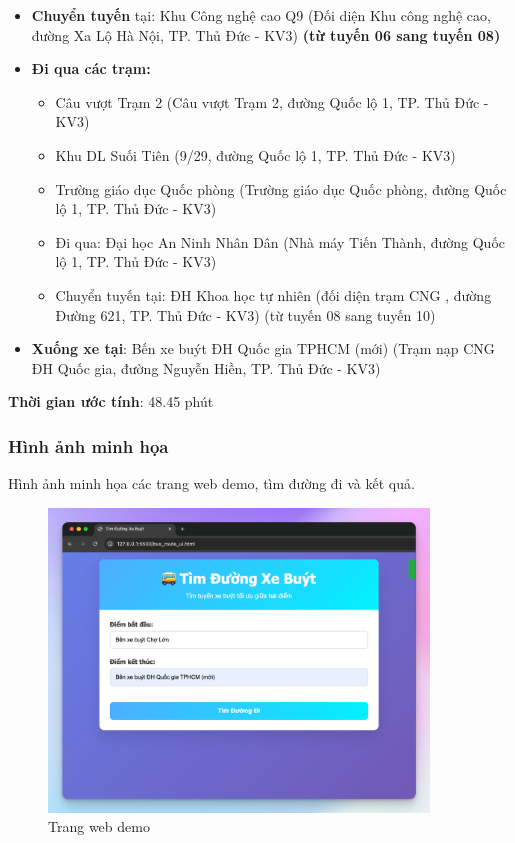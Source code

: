 \documentclass[a4paper,12pt]{article}
\begin{document}
\begin{itemize}
    \item \textbf{Chuyển tuyến} tại: Khu Công nghệ cao Q9 (Đối diện Khu công nghệ cao, đường Xa Lộ Hà Nội, TP. Thủ Đức - KV3) \textbf{(từ tuyến 06 sang tuyến 08)}
    
    \item \textbf{Đi qua các trạm:}
    \begin{itemize}
        \item Câu vượt Trạm 2 (Câu vượt Trạm 2, đường Quốc lộ 1, TP. Thủ Đức - KV3)
        \item Khu DL Suối Tiên (9/29, đường Quốc lộ 1, TP. Thủ Đức - KV3)
        \item Trường giáo dục Quốc phòng (Trường giáo dục Quốc phòng, đường Quốc lộ 1, TP. Thủ Đức - KV3)
        \item Đi qua: Đại học An Ninh Nhân Dân (Nhà máy Tiến Thành, đường Quốc lộ 1, TP. Thủ Đức - KV3)
        \item Chuyển tuyến tại: ĐH Khoa học tự nhiên (đối diện trạm CNG , đường Đường 621, TP. Thủ Đức - KV3) (từ tuyến 08 sang tuyến 10)
    \end{itemize}
    \item \textbf{Xuống xe tại}: Bến xe buýt ĐH Quốc gia TPHCM (mới) (Trạm nạp CNG ĐH Quốc gia, đường Nguyễn Hiền, TP. Thủ Đức - KV3)
\end{itemize}

\textbf{Thời gian ước tính}: 48.45 phút

\subsubsection{Hình ảnh minh họa}
Hình ảnh minh họa các trang web demo, tìm đường đi và kết quả.

\begin{figure}[H]
    \centering
    \includegraphics[width=0.9\textwidth]{images/image1.png}
    \caption{Trang web demo}
    \label{fig:demo}
\end{figure}
\end{document}
